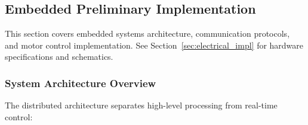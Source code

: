 
\subsection{Embedded Preliminary Implementation}
\label{sec:embedded_impl}

This section covers embedded systems architecture, communication protocols, and motor control implementation. See Section~\ref{sec:electrical_impl} for hardware specifications and schematics.

\subsubsection{System Architecture Overview}

The distributed architecture separates high-level processing from real-time control:


